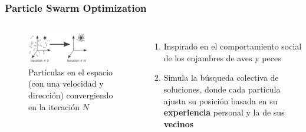 \begin{frame}
  \frametitle{Particle Swarm Optimization}
  \begin{columns}
    \begin{figure}
      \begin{center}
        \includegraphics[width=0.7\textwidth]{imagenes/chapter3/pso.png}
      \end{center}
      \caption{Partículas en el espacio (con una velocidad y dirección) convergiendo en la iteración $N$}
    \end{figure}
    \begin{enumerate}
      \item Inspirado en el comportamiento social de los enjambres de aves y peces
      \item Simula la búsqueda colectiva de soluciones, donde cada partícula ajusta su posición basada en su \textbf{experiencia} personal y la de sus \textbf{vecinos}
    \end{enumerate}
  \end{columns}
\end{frame}

